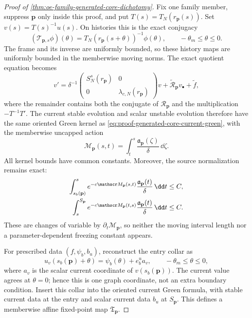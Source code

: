 \begin{proof}[Proof of
\cref{thm:oe-family-generated-core-dichotomy}]
Fix one family member, suppress \(\mathbf p\) only inside this proof, and
put \(T(s)=T_N(r_{\mathbf p}(s))\).  Set
\(v(s)=T(s)^{-1}u(s)\).  On histories this is the exact conjugacy
\[
 (\mathcal T_{\mathbf p,s}\phi)(\theta)
 =T_N(r_{\mathbf p}(s+\theta))^{-1}\phi(\theta),
 \qquad -\theta_m\le\theta\le0.
\]
The frame and its inverse are uniformly bounded, so these history maps
are uniformly bounded in the memberwise moving norms.  The exact quotient
equation becomes
\begin{equation}
 v'=\delta^{-1}
 \begin{pmatrix}S_N^s(r_{\mathbf p})&0\\0&\lambda_{c,N}(r_{\mathbf p})
 \end{pmatrix}v
 +\widetilde{\mathcal R}_{\mathbf p}v_\bullet
 +\widetilde f,                                 \label{eq:proof-oe-family-core-frame-equation}
\end{equation}
where the remainder contains both the conjugate of
\(\mathcal R_{\mathbf p}\) and the multiplication
\(-T^{-1}T'\).  The current stable evolution and scalar unstable evolution
therefore have the same oriented Green kernel as
\cref{eq:proof-generated-core-current-green}, with the memberwise
uncapped action
\begin{equation}
 \mathscr M_{\mathbf p}(s,t)
 =\int_t^s\frac{\mathfrak a_{\mathbf p}(\zeta)}\delta\,\dd\zeta.
                                                        \label{eq:proof-oe-family-core-uncapped-action}
\end{equation}
All kernel bounds have common constants.  Moreover, the source
normalization remains exact:
\begin{align}
 \int_{s_b(\mathbf p)}^s
 e^{-c\mathscr M_{\mathbf p}(s,t)}
       \frac{\mathfrak a_{\mathbf p}(t)}\delta\,\dd t
 &\le C,\notag\\
 \int_s^{S_{\mathbf p}}
 e^{-c\mathscr M_{\mathbf p}(t,s)}
       \frac{\mathfrak a_{\mathbf p}(t)}\delta\,\dd t
 &\le C.                                         \label{eq:proof-oe-family-core-source-integrals}
\end{align}
These are changes of variable by \(\partial_t\mathscr M_{\mathbf p}\),
so neither the moving interval length nor a parameter-dependent freezing
constant appears.

For prescribed data \((f,\psi_b,b_u)\), reconstruct the entry collar as
\begin{equation}
 \widehat u_v(s_b(\mathbf p)+\theta)
 =\psi_b(\theta)+e_b^u a_v,\qquad
 -\theta_m\le\theta\le0,                       \label{eq:proof-oe-family-core-entry-collar}
\end{equation}
where \(a_v\) is the scalar current coordinate of \(v(s_b(\mathbf p))\).
The current value agrees at \(\theta=0\); hence this is one graph
coordinate, not an extra boundary condition.  Insert this collar into the
oriented current Green formula, with stable current data at the entry and
scalar current data \(b_u\) at \(S_{\mathbf p}\).  This defines a
memberwise affine fixed-point map \(\mathfrak T_{\mathbf p}\).


\end{proof}
